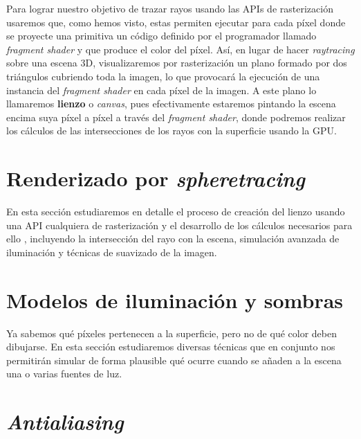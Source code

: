 Para lograr nuestro objetivo de trazar rayos usando las APIs de rasterización usaremos que, como hemos visto, estas permiten ejecutar para cada píxel donde se proyecte una primitiva un código definido por el programador llamado \textit{fragment shader} y que produce el color del píxel. Así, en lugar de hacer \textit{raytracing} sobre una escena 3D, visualizaremos por rasterización un plano formado por dos triángulos cubriendo toda la imagen, lo que provocará la ejecución de una instancia del \textit{fragment shader} en cada píxel de la imagen. A este plano lo llamaremos \textbf{lienzo} o \textit{canvas}, pues efectivamente estaremos pintando la escena encima suya píxel a píxel a través del \textit{fragment shader}, donde podremos realizar los cálculos de las intersecciones de los rayos con la superficie usando la GPU. 

\section{Renderizado por \textit{spheretracing}}\label{sec:render}
En esta sección estudiaremos en detalle el proceso de creación del lienzo usando una API cualquiera de rasterización y el desarrollo de los cálculos necesarios para ello , incluyendo la intersección del rayo con la escena, simulación avanzada de iluminación y técnicas de suavizado de la imagen.


\section{Modelos de iluminación y sombras}\label{sec:ilum}
Ya sabemos qué píxeles pertenecen a la superficie, pero no de qué color deben dibujarse. En esta sección estudiaremos diversas técnicas que en conjunto nos permitirán simular de forma plausible qué ocurre cuando se añaden a la escena una o varias fuentes de luz.






\section{\textit{Antialiasing}}
